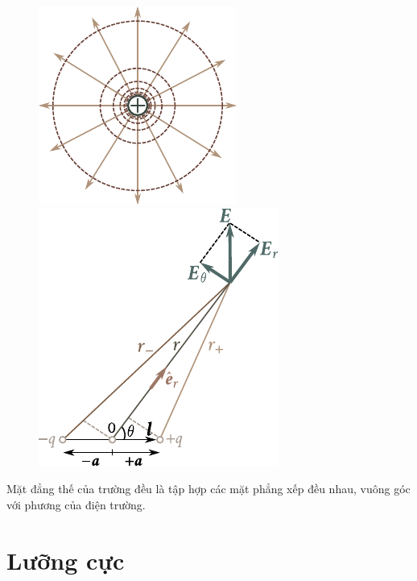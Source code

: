 \begin{figure}[!htb]
	\begin{minipage}[t]{0.5\linewidth}
		\begin{center}
			\includegraphics[scale=1]{figures/ch_01/fig_1_8.pdf}
			\caption[]{}
			\label{fig:1_8}
		\end{center}
	\end{minipage}
	\hspace{-0.05cm}
	\begin{minipage}[t]{0.5\linewidth}
		\begin{center}
			\includegraphics[scale=0.95]{figures/ch_01/fig_1_9.pdf}
			\caption[]{}
			\label{fig:1_9}
		\end{center}
	\end{minipage}
\vspace{-0.4cm}
\end{figure}

Mặt đẳng thế của trường đều là tập hợp các mặt phẳng xếp đều nhau, vuông góc với phương của điện trường.

\section{Lưỡng cực}\label{sec:1_9}


